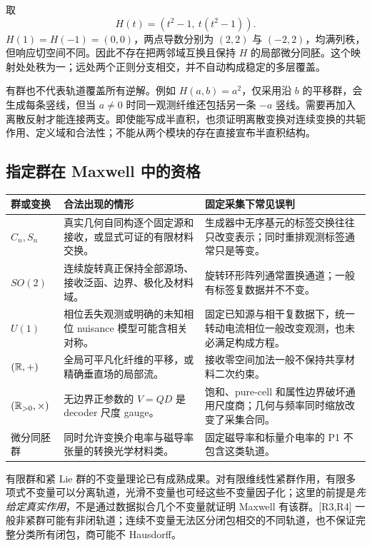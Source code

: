 \begin{example}[满秩的远处逆解也未必形成局部对称]
取
\begin{equation}
H(t)=(t^2-1,\ t(t^2-1)).
\end{equation}
$H(1)=H(-1)=(0,0)$，两点导数分别为 $(2,2)$ 与 $(-2,2)$，均满列秩，但响应切空间不同。因此不存在把两邻域互换且保持 $H$ 的局部微分同胚。这个映射处处秩为一；远处两个正则分支相交，并不自动构成稳定的多层覆盖。
\end{example}

有群也不代表轨道覆盖所有逆解。例如 $H(a,b)=a^2$，仅采用沿 $b$ 的平移群，会生成每条竖线，但当 $a\ne0$ 时同一观测纤维还包括另一条 $-a$ 竖线。需要再加入离散反射才能连接两支。即使能写成半直积，也须证明离散变换对连续变换的共轭作用、定义域和合法性；不能从两个模块的存在直接宣布半直积结构。

\subsection{指定群在 Maxwell 中的资格}

\begin{longtable}{p{}p{}p{}}
\toprule 群或变换 & 合法出现的情形 & 固定采集下常见误判\\\midrule\endhead
$C_n,S_n$ & 真实几何自同构逐个固定源和接收，或显式可证的有限材料交换。 & 生成器中无序基元的标签交换往往只改变表示；同时重排观测标签通常只是等变。\\
$SO(2)$ & 连续旋转真正保持全部源场、接收泛函、边界、极化及材料域。 & 旋转环形阵列通常置换通道；一般有标签复数据并不不变。\\
$U(1)$ & 相位丢失观测或明确的未知相位 nuisance 模型可能含相关对称。 & 固定已知源与相干复数据下，统一转动电流相位一般改变观测，也未必满足构成方程。\\
$(\mathbb R,+)$ & 全局可平凡化纤维的平移，或精确垂直场的局部流。 & 接收零空间加法一般不保持共享材料二次约束。\\
$(\mathbb R_{>0},\times)$ & 无边界正参数的 $V=QD$ 是 decoder 尺度 gauge。 & 饱和、pure-cell 和属性边界破坏通用尺度商；几何与频率同时缩放改变了采集合同。\\
微分同胚群 & 同时允许变换介电率与磁导率张量的转换光学材料类。 & 固定磁导率和标量介电率的 P1 不包含这类轨道。\\\bottomrule
\end{longtable}

有限群和紧 Lie 群的不变量理论已有成熟成果。对有限维线性紧群作用，有限多项式不变量可以分离轨道，光滑不变量也可经这些不变量因子化；这里的前提是\emph{先给定真实作用}，不是通过数据拟合几个不变量就证明 Maxwell 有该群。[R3,R4] 一般非紧群可能有非闭轨道；连续不变量无法区分闭包相交的不同轨道，也不保证完整分类所有闭包，商可能不 Hausdorff。

